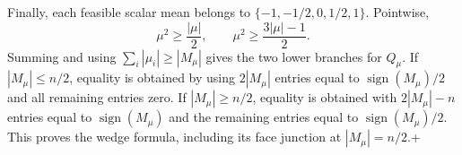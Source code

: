 Finally, each feasible scalar mean belongs to \(\{-1,-1/2,0,1/2,1\}\).  Pointwise,
\[
 \mu^2\geq\frac{|\mu|}{2},
 \qquad
 \mu^2\geq\frac{3|\mu|-1}{2}.
\]
Summing and using \(\sum_i|\mu_i|\geq|M_\mu|\) gives the two lower branches for \(Q_\mu\).  If \(|M_\mu|\leq n/2\), equality is obtained by using \(2|M_\mu|\) entries equal to \(\operatorname{sign}(M_\mu)/2\) and all remaining entries zero.  If \(|M_\mu|\geq n/2\), equality is obtained with \(2|M_\mu|-n\) entries equal to \(\operatorname{sign}(M_\mu)\) and the remaining entries equal to \(\operatorname{sign}(M_\mu)/2\).  This proves the wedge formula, including its face junction at \(|M_\mu|=n/2\).+